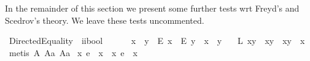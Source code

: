 \begin{isabellebody}
\endisatagproof
{\isafoldproof}%
%
\isadelimproof
%
\endisadelimproof
%
\begin{isamarkuptext}%
In the remainder of this section we present some further tests wrt Freyd's and Scedrov's theory. 
We leave these tests uncommented.%
\end{isamarkuptext}%
\isamarkuptrue%
\isamarkupfalse%
\ DirectedEquality\ {\isacharcolon}{\isacharcolon}\ {\isachardoublequoteopen}i{\isasymRightarrow}i{\isasymRightarrow}bool{\isachardoublequoteclose}\ {\isacharparenleft}\ {\isachardoublequoteopen}{\isasymgreaterapprox}{\isachardoublequoteclose}\ {}{}{\isacharparenright}\ \isanewline
\ \ {\isachardoublequoteopen}x\ {\isasymgreaterapprox}\ y\ {\isasymequiv}\ {\isacharparenleft}{\isacharparenleft}\isactrlbold E\ x{\isacharparenright}\ \isactrlbold {\isasymrightarrow}\ {\isacharparenleft}\isactrlbold E\ y{\isacharparenright}{\isacharparenright}\ \isactrlbold {\isasymand}\ x\ \isactrlbold {\isacharequal}\ y{\isachardoublequoteclose}\ \ \isanewline
\isanewline
{}\isamarkupfalse%
\ L{}{\isacharunderscore}{}{}{\isacharcolon}\ {\isachardoublequoteopen}{\isacharparenleft}{\isacharparenleft}{\isasymbox}{\isacharparenleft}x{\isasymcdot}y{\isacharparenright}{\isacharparenright}\ {\isasymapprox}\ {\isacharparenleft}{\isasymbox}{\isacharparenleft}x{\isasymcdot}{\isacharparenleft}{\isasymbox}y{\isacharparenright}{\isacharparenright}{\isacharparenright}{\isacharparenright}\ \isactrlbold {\isasymleftrightarrow}\ {\isacharparenleft}{\isacharparenleft}{\isasymbox}{\isacharparenleft}x{\isasymcdot}y{\isacharparenright}{\isacharparenright}\ {\isasymgreaterapprox}\ {\isasymbox}x{\isacharparenright}{\isachardoublequoteclose}%
\isadelimproof
\ %
\endisadelimproof
%
\isatagproof
{}\isamarkupfalse%
\ {\isacharparenleft}metis\ A{}\ A{}a\ A{}a{\isacharparenright}%
\endisatagproof
{\isafoldproof}%
%
\isadelimproof
%
\endisadelimproof
\isanewline
\isanewline
{}\isamarkupfalse%
\ {\isachardoublequoteopen}{\isacharparenleft}\isactrlbold {\isasymexists}x{\isachardot}\ e\ {\isasymapprox}\ {\isacharparenleft}{\isasymbox}x{\isacharparenright}{\isacharparenright}\ \isactrlbold {\isasymleftrightarrow}\ {\isacharparenleft}\isactrlbold {\isasymexists}x{\isachardot}\ e\ {\isasymapprox}\ {\isacharparenleft}x{\isasymbox}{\isacharparenright}{\isacharparenright}{\isachardoublequoteclose}%
\isadelimproof
\ %
\endisadelimproof
%
\isatagproof
{}\isamarkupfalse%

\end{isabellebody}
